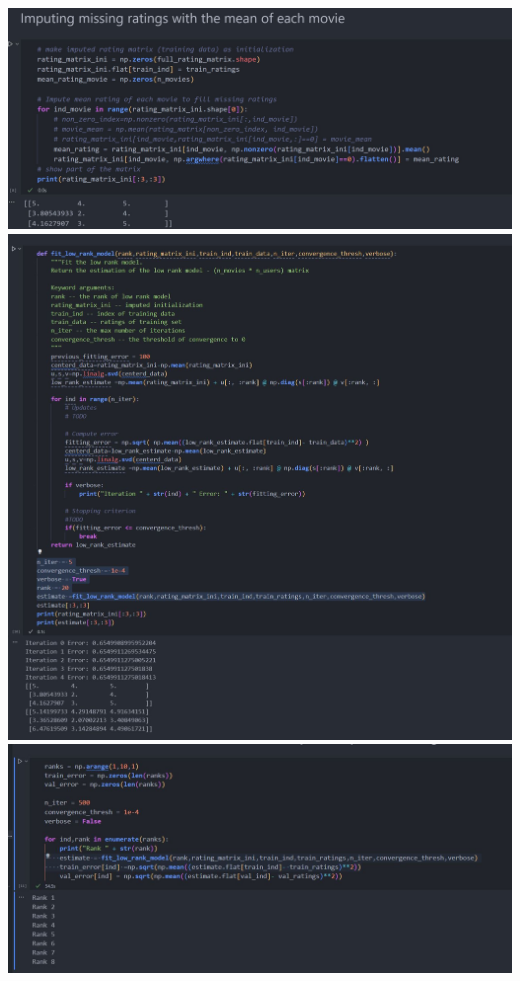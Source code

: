 \documentclass[12pt,twoside]{article}
\begin{document}
\begin{enumerate}
\begin{itemize}
    \color{blue}
\includegraphics[width=14cm]{homework/homework_10/images/part_a.jpg}\\

\includegraphics[width=20cm]{homework/homework_10/images/part_b.jpg}
\\
\includegraphics[width=20cm]{homework/homework_10/images/part_c_1.jpg}

\end{itemize}
\end{enumerate}
\end{document}
